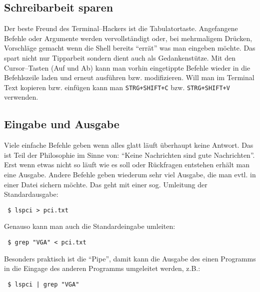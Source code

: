 \subsection{Schreibarbeit sparen}
Der beste Freund des Terminal--Hackers ist die Tabulatortaste. Angefangene Befehle oder Argumente werden vervollständigt oder, bei mehrmaligem Drücken, Vorschläge gemacht wenn die Shell bereits ``errät'' was man eingeben möchte. Das spart nicht nur Tipparbeit sondern dient auch als Gedankenstütze. Mit den Cursor--Tasten (Auf und Ab) kann man vorhin eingetippte Befehle wieder in die Befehlszeile laden und erneut ausführen bzw. modifizieren. Will man im Terminal Text kopieren bzw. einfügen kann man \lstinline|STRG+SHIFT+C| bzw. \lstinline|STRG+SHIFT+V| verwenden.

\subsection{Eingabe und Ausgabe}
Viele einfache Befehle geben wenn alles glatt läuft überhaupt keine Antwort. Das ist Teil der Philosophie im Sinne von: ``Keine Nachrichten sind gute Nachrichten''. Erst wenn etwas nicht so läuft wie es soll oder Rückfragen entstehen erhält man eine Ausgabe. Andere Befehle geben wiederum sehr viel Ausgabe, die man evtl. in einer Datei sichern möchte. Das geht mit einer sog. Umleitung der Standardausgabe:
\begin{lstlisting}
 $ lspci > pci.txt
\end{lstlisting}
Genauso kann man auch die Standardeingabe umleiten:
\begin{lstlisting}
 $ grep "VGA" < pci.txt
\end{lstlisting}
Besonders praktisch ist die ``Pipe'', damit kann die Ausgabe des einen Programms in die Eingage des anderen Programms umgeleitet werden, z.B.:
\begin{lstlisting}
 $ lspci | grep "VGA"
\end{lstlisting}